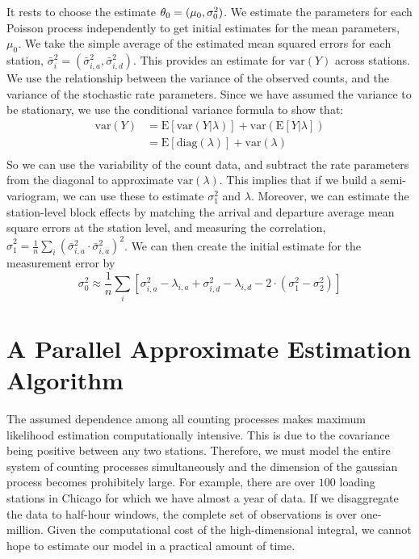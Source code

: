 \documentclass{acm_proc_article-sp}
\begin{document}
It rests to choose the estimate $\theta_0 = (\mu_0 , {\bf \sigma}_0^2)$.  We estimate the parameters for each Poisson process independently to get initial estimates for the mean parameters, $\mu_0$.  We take the simple average of the estimated mean squared errors for each station, $\bar{\sigma}_i^2 = \left( \bar{\sigma}_{i,a}^2 ,\bar{\sigma}_{i,d}^2 \right)$.  This provides an estimate for $\text{var} (Y)$ across stations.   We use the relationship between the variance of the observed counts, and the variance of the stochastic rate parameters.  Since we have assumed the variance to be stationary, we use the conditional variance formula to show that:
\begin{align*} 
\text{var} \left( Y \right) &= \text{E} \left[ \text{var} \left( Y | \lambda \right) \right] + \text{var} \left( \text{E} \left[ Y | \lambda \right] \right) \\
&= \text{E} \left[ \text{diag} (\lambda) \right] + \text{var} \left( \lambda \right) \\
\end{align*}
\noindent So we can use the variability of the count data, and subtract the rate parameters from the diagonal to approximate $\text{var}(\lambda)$.  This implies that if we build a semi-variogram, we can use these to estimate $\sigma_1^2$ and $\lambda$.  Moreover, we can estimate the station-level block effects by matching the arrival and departure average mean square errors at the station level, and measuring the correlation, $\hat{\sigma}_1^2 = \frac{1}{n} \sum_i ( \bar{\sigma}_{i,a}^2  \cdot \bar{\sigma}_{i,a}^2 )^2$.  We can then create the initial estimate for the measurement error by
\begin{equation*}
\sigma_0^2 \approx \frac{1}{n}\sum_i \left[ \sigma^2_{i,a} - \lambda_{i,a} + \sigma^2_{i,d} - \lambda_{i,d}  - 2\cdot \left(\sigma_1^2 - \sigma_2^2 \right) \right]
\end{equation*}

\section{A Parallel Approximate Estimation Algorithm} \label{parallel_estimation}

The assumed dependence among all counting processes makes maximum likelihood estimation computationally intensive.  This is due to the covariance being positive between any two stations.  Therefore, we must model the entire system of counting processes simultaneously and the dimension of the gaussian process becomes prohibitely large.  For example, there are over $100$ loading stations in Chicago for which we have almost a year of data.  If we disaggregate the data to half-hour windows, the complete set of observations is over one-million.  Given the computational cost of the high-dimensional integral, we cannot hope to estimate our model in a practical amount of time.
\end{document}
